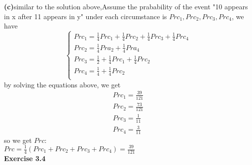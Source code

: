 \documentclass{article} %
\begin{document}
	\textbf{(c)}similar to the solution above,Assume the prabability of the event "10 appears in x after 11 appears in y" under each circumstance is $Prc_1,Prc_2,Prc_3,Prc_4$, we have
	$$
	\begin{cases}
	Prc_1=\frac{1}{4}Prc_1+\frac{1}{4}Prc_2+\frac{1}{4}Prc_3+\frac{1}{4}Prc_4\\
	Prc_2=\frac{1}{4}Pra_2+\frac{1}{4}Pra_4\\
	Prc_3=\frac{1}{2}+\frac{1}{4}Prc_1+\frac{1}{4}Prc_2\\
	Prc_4=\frac{1}{4}+\frac{1}{4}Prc_2\\
	\end{cases}
	$$
	by solving the equations above, we get
	\begin{equation*}
	\begin{split}
	Prc_1=\frac{39}{121}\\
	Prc_2=\frac{73}{121}\\
	Prc_3=\frac{1}{11}\\
	Prc_4=\frac{3}{11}
	\end{split}
	\end{equation*}
	so we get $Prc$:\\
	$Prc=\frac{1}{4}(Prc_1+Prc_2+Prc_3+Prc_4) = \frac{39}{121} $\\




	\textbf{Exercise 3.4}\par






	
\end{document}
